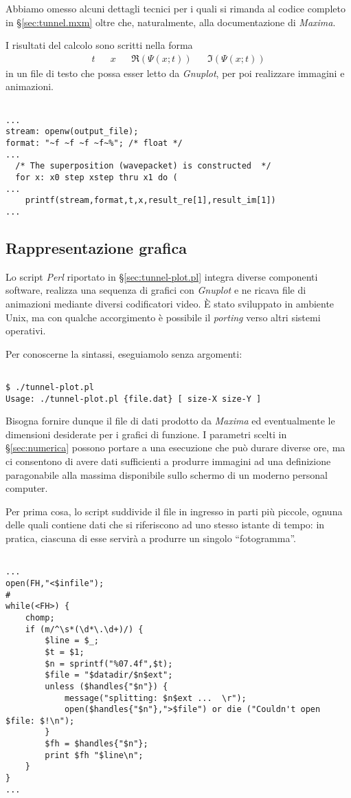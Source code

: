 Abbiamo omesso alcuni dettagli tecnici per i quali si rimanda
al codice completo in \S\ref{sec:tunnel.mxm} oltre che,
naturalmente, alla documentazione di \emph{Maxima}\cite{MAXIMA}. 

I risultati del calcolo sono scritti nella forma 
\begin{align*}
t	&& x 	&& \Re(\Psi(x;t)) 	&& \Im(\Psi(x;t)) 
\end{align*}
in un file
di testo che possa esser letto da \emph{Gnuplot}\cite{GNUPLOT},
per poi realizzare immagini e animazioni.
\begin{lstlisting}

...
stream: openw(output_file);
format: "~f ~f ~f ~f~%"; /* float */
...
  /* The superposition (wavepacket) is constructed  */
  for x: x0 step xstep thru x1 do (
...
    printf(stream,format,t,x,result_re[1],result_im[1])
...
\end{lstlisting}


\subsection{Rappresentazione grafica \label{sec:tunnel-graph}}
Lo script \emph{Perl} riportato in \S\ref{sec:tunnel-plot.pl} 
integra diverse componenti software,
realizza una sequenza di grafici con \emph{Gnuplot}\cite{GNUPLOT} 
e ne ricava file di animazioni mediante diversi codificatori video.
\`E stato sviluppato in ambiente Unix, ma con qualche accorgimento
è possibile il \emph{porting} verso altri sistemi operativi.

Per conoscerne la sintassi, eseguiamolo senza argomenti:
\begin{lstlisting}

$ ./tunnel-plot.pl
Usage: ./tunnel-plot.pl {file.dat} [ size-X size-Y ]

\end{lstlisting}
Bisogna fornire dunque il file di dati prodotto da \emph{Maxima}
ed eventualmente le dimensioni desiderate per i grafici di funzione. 
I parametri scelti in \S\ref{sec:numerica} possono portare
a una esecuzione che può durare diverse ore, ma ci consentono di avere
dati sufficienti a produrre immagini ad una definizione
paragonabile alla massima disponibile sullo schermo di un moderno
personal computer.

Per prima cosa, lo script suddivide il file in ingresso in parti
più piccole, ognuna delle quali contiene dati che si riferiscono
ad uno stesso istante di tempo: in pratica, ciascuna di esse servirà
a produrre un singolo ``fotogramma''.
\begin{lstlisting}

...
open(FH,"<$infile");
#
while(<FH>) {
    chomp;
    if (m/^\s*(\d*\.\d+)/) {
        $line = $_;
        $t = $1;
        $n = sprintf("%07.4f",$t);
        $file = "$datadir/$n$ext";
        unless ($handles{"$n"}) {
            message("splitting: $n$ext ...  \r");
            open($handles{"$n"},">$file") or die ("Couldn't open $file: $!\n");
        }
        $fh = $handles{"$n"};
        print $fh "$line\n";
    }
}
...
\end{lstlisting}

